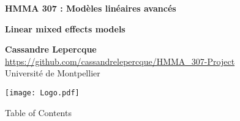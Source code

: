 \documentclass[unknownkeysallowed]{beamer}
\begin{document}



\begin{frame}
\bigskip
\bigskip
\begin{center}{
\LARGE\color{marron}
\textbf{HMMA 307 : Modèles linéaires avancés}
\textbf{ }\\
\vspace{0.5cm}
}

\color{marron}
\textbf{Linear mixed effects models}
\end{center}

\vspace{0.5cm}

\begin{center}
\textbf{Cassandre Lepercque} \\
\vspace{0.1cm}
\url{https://github.com/cassandrelepercque/HMMA_307-Project}\\
\vspace{0.5cm}
Université de Montpellier \\
\end{center}

\centering
\texttt{[image: Logo.pdf]}

\end{frame}




\begin{frame}{Table of Contents}
\tableofcontents[hideallsubsections]
\end{frame}


\end{document}
